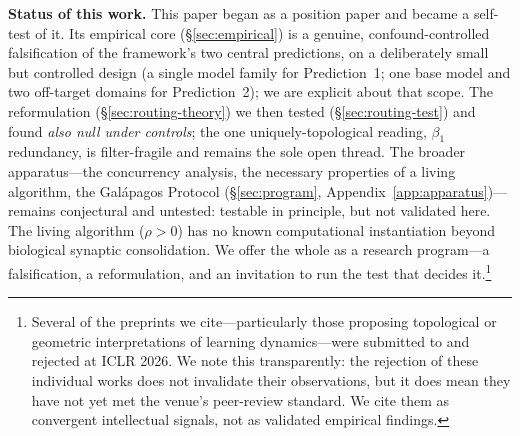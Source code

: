 \documentclass{article}
\begin{document}
\medskip
\noindent\textbf{Status of this work.}
This paper began as a position paper and became a self-test of it. Its empirical core
(\S\ref{sec:empirical}) is a genuine, confound-controlled falsification of the framework's two
central predictions, on a deliberately small but controlled design (a single model family for
Prediction~1; one base model and two off-target domains for Prediction~2); we are explicit about that
scope. The reformulation (\S\ref{sec:routing-theory}) we then tested (\S\ref{sec:routing-test}) and found
\emph{also null under controls}; the one uniquely-topological reading, $\beta_1$ redundancy, is
filter-fragile and remains the sole open thread. The broader apparatus---the
concurrency analysis, the necessary properties of a living algorithm, the Gal\'apagos Protocol
(\S\ref{sec:program}, Appendix~\ref{app:apparatus})---remains conjectural and untested: testable in
principle, but not validated here. The living algorithm ($\rho > 0$) has no known computational
instantiation beyond biological synaptic consolidation. We offer the whole as a research
program---a falsification, a reformulation, and an invitation to run the test that decides it.\footnote{Several of the preprints we cite---particularly those proposing topological or geometric interpretations of learning dynamics---were submitted to and rejected at ICLR 2026. We note this transparently: the rejection of these individual works does not invalidate their observations, but it does mean they have not yet met the venue's peer-review standard. We cite them as convergent intellectual signals, not as validated empirical findings.}
\end{document}
